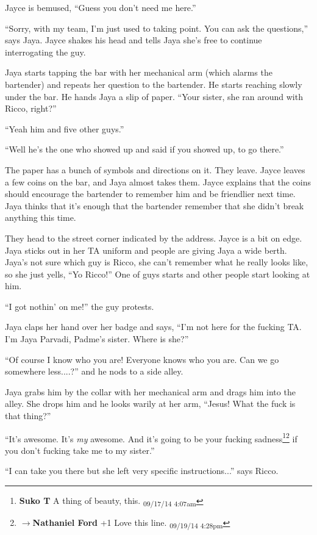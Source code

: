 Jayce is bemused, ``Guess you don't need me here.''

``Sorry, with my team, I'm just used to taking point.  You can ask the questions,'' says Jaya.  Jayce shakes his head and tells Jaya she's free to continue interrogating the guy.

Jaya starts tapping the bar with her mechanical arm (which alarms the bartender) and repeats her question to the bartender.  He starts reaching slowly under the bar.  He hands Jaya a slip of paper.  ``Your sister, she ran around with Ricco, right?''

``Yeah him and five other guys.''

``Well he's the one who showed up and said if you showed up, to go there.''

The paper has a bunch of symbols and directions on it.  They leave.  Jayce leaves a few coins on the bar, and Jaya almost takes them.  Jayce explains that the coins should encourage the bartender to remember him and be friendlier next time.  Jaya thinks that it's enough that the bartender remember that she didn't break anything this time.



They head to the street corner indicated by the address.  Jayce is a bit on edge.  Jaya sticks out in her TA uniform and people are giving Jaya a wide berth.  Jaya's not sure which guy is Ricco, she can't remember what he really looks like, so she just yells, ``Yo Ricco!''  One of guys starts and other people start looking at him.

``I got nothin' on me!'' the guy protests.

Jaya claps her hand over her badge and says, ``I'm not here for the fucking TA. I'm Jaya Parvadi, Padme's sister.  Where is she?''

``Of course I know who you are!  Everyone knows who you are.  Can we go somewhere less....?'' and he nods to a side alley.

Jaya grabs him by the collar with her mechanical arm and drags him into the alley.  She drops him and he looks warily at her arm, ``Jesus! What the fuck is that thing?''

``It's awesome.  It's \textit{my} awesome.  And it's going to be your fucking sadness\footnote{\textbf{Suko T }A thing of beauty, this. \textsubscript{09/17/14 4:07am}}\footnote{$\rightarrow$\textbf{Nathaniel Ford }+1 Love this line. \textsubscript{09/19/14 4:28pm}} if you don't fucking take me to my sister.''

``I can take you there but she left very specific instructions...'' says Ricco.

